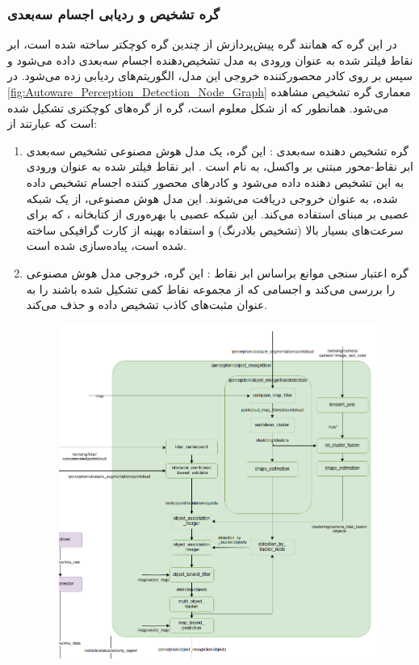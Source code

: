 \subsubsection{گره تشخیص و ردیابی اجسام سه‌بعدی}
در این گره که همانند گره پیش‌پردازش از چندین گره کوچکتر ساخته شده است، ابر نقاط فیلتر شده به عنوان ورودی به مدل‌ تشخیص‌دهنده اجسام سه‌بعدی داده می‌شود و سپس بر روی کادر محصور‌کننده خروجی این مدل، الگوریتم‌های ردیابی زده می‌شود. در \cref{fig:Autoware_Perception_Detection_Node_Graph} معماری گره تشخیص مشاهده می‌شود. همانطور که از شکل معلوم است، گره  از گره‌های کوچکتری تشکیل شده است که عبارتند از:
\begin{enumerate}
    \item گره تشخیص دهنده سه‌بعدی : این گره، یک مدل هوش مصنوعی تشخیص سه‌بعدی ابر نقاط-محور مبتنی بر واکسل، به نام  است \cite{yin2021center}. ابر نقاط فیلتر شده به عنوان ورودی به این تشخیص دهنده داده‌ می‌شود و کادر‌های محصور کننده اجسام تشخیص داده شده، به عنوان خروجی دریافت می‌شوند. این مدل هوش مصنوعی، از یک شبکه عصبی بر مبنای  \cite{lang2019pointpillars} استفاده می‌کند. این شبکه عصبی با بهره‌وری از کتابخانه ، که برای سرعت‌های بسیار بالا (تشخیص بلادرنگ) و استفاده بهینه از کارت گرافیکی ساخته شده است، پیاده‌سازی شده است.
    \item گره اعتبار سنجی موانع براساس ابر نقاط : این گره، خروجی مدل هوش‌ مصنوعی را بررسی می‌کند و اجسامی که از مجموعه نقاط کمی تشکیل شده باشند را به عنوان مثبت‌های کاذب تشخیص داده و حذف می‌کند.
    \begin{figure}[h!]
    \centering
    \includegraphics[width=1\linewidth]{figures/Autoware_Perception_Detection_Node_Graph.png}

\end{figure}
\end{enumerate}
